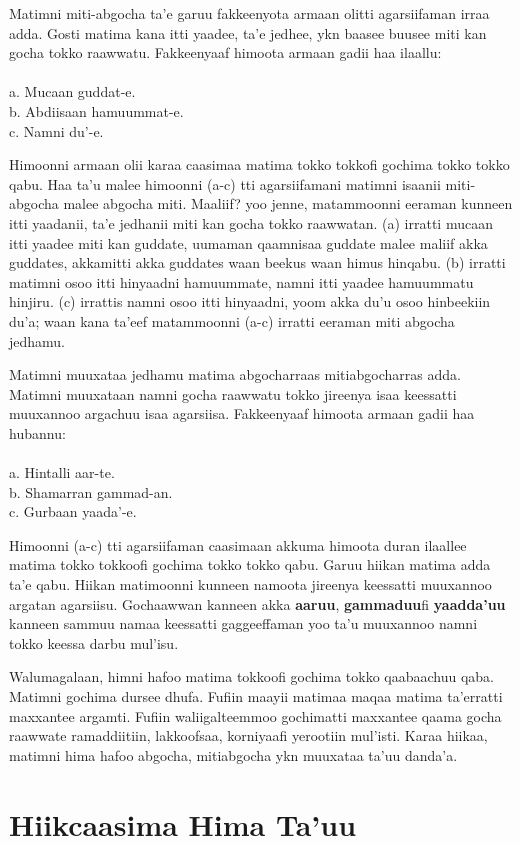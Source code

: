 \documentclass[11pt,b5paper]{book}
\begin{document}
Matimni miti-abgocha ta’e garuu fakkeenyota armaan olitti agarsiifaman irraa adda. Gosti matima kana itti yaadee, ta’e jedhee, ykn baasee buusee miti kan gocha tokko raawwatu. Fakkeenyaaf himoota armaan gadii haa ilaallu:\\
\\
a. Mucaan guddat-e.\\
b. Abdiisaan hamuummat-e.\\
c. Namni du’-e.

Himoonni armaan olii karaa caasimaa matima tokko tokkofi gochima tokko tokko qabu. Haa ta’u malee himoonni (a-c) tti agarsiifamani matimni isaanii miti-abgocha malee abgocha miti. Maaliif? yoo jenne, matammoonni eeraman kunneen itti yaadanii, ta’e jedhanii miti kan gocha tokko raawwatan. (a) irratti mucaan itti yaadee miti kan guddate, uumaman qaamnisaa guddate malee maliif akka guddates, akkamitti akka guddates waan beekus waan himus hinqabu. (b) irratti matimni osoo itti hinyaadni hamuummate, namni itti yaadee hamuummatu hinjiru. (c) irrattis namni osoo itti hinyaadni, yoom akka
du’u osoo hinbeekiin du’a; waan kana ta’eef matammoonni (a-c) irratti eeraman miti abgocha jedhamu.

Matimni muuxataa jedhamu matima abgocharraas mitiabgocharras adda. Matimni muuxataan namni gocha raawwatu tokko jireenya isaa keessatti muuxannoo argachuu isaa agarsiisa. Fakkeenyaaf himoota armaan gadii haa hubannu: \\
\\
a. Hintalli aar-te.\\
b. Shamarran gammad-an.\\
c. Gurbaan yaada’-e.

Himoonni (a-c) tti agarsiifaman caasimaan akkuma himoota duran ilaallee matima tokko tokkoofi gochima tokko tokko qabu. Garuu hiikan matima adda ta’e qabu. Hiikan matimoonni kunneen namoota jireenya keessatti muuxannoo argatan agarsiisu. Gochaawwan kanneen akka \textbf{aaruu}, \textbf{gammaduu}fi \textbf{yaadda’uu} kanneen sammuu namaa keessatti gaggeeffaman yoo ta’u muuxannoo namni tokko keessa darbu mul’isu.

Walumagalaan, himni hafoo matima tokkoofi gochima tokko qaabaachuu qaba. Matimni gochima dursee dhufa. Fufiin maayii matimaa maqaa matima ta’erratti maxxantee argamti. Fufiin waliigalteemmoo gochimatti maxxantee qaama gocha raawwate ramaddiitiin, lakkoofsaa, korniyaafi yerootiin mul’isti. Karaa hiikaa, matimni hima hafoo abgocha, mitiabgocha ykn muuxataa ta’uu danda’a.

\section{Hiikcaasima Hima Ta'uu}
\end{document}
